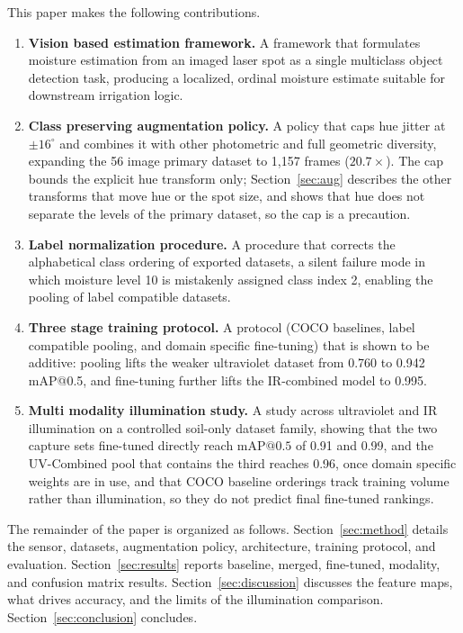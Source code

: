 ﻿\documentclass[journal]{IEEEtran}
\begin{document}
This paper makes the following contributions.
\begin{enumerate}
\item \textbf{Vision based estimation framework.} A framework that formulates moisture estimation from an imaged laser spot as a single multiclass object detection task, producing a localized, ordinal moisture estimate suitable for downstream irrigation logic.
\item \textbf{Class preserving augmentation policy.} A policy that caps hue jitter at $\pm 16^{\circ}$ and combines it with other photometric and full geometric diversity, expanding the 56 image primary dataset to 1{,}157 frames ($20.7\times$). The cap bounds the explicit hue transform only; Section~\ref{sec:aug} describes the other transforms that move hue or the spot size, and shows that hue does not separate the levels of the primary dataset, so the cap is a precaution.
\item \textbf{Label normalization procedure.} A procedure that corrects the alphabetical class ordering of exported datasets, a silent failure mode in which moisture level 10 is mistakenly assigned class index 2, enabling the pooling of label compatible datasets.
\item \textbf{Three stage training protocol.} A protocol (COCO baselines, label compatible pooling, and domain specific fine-tuning) that is shown to be additive: pooling lifts the weaker ultraviolet dataset from 0.760 to 0.942 mAP@0.5, and fine-tuning further lifts the IR-combined model to 0.995.
\item \textbf{Multi modality illumination study.} A study across ultraviolet and IR illumination on a controlled soil-only dataset family, showing that the two capture sets fine-tuned directly reach $\text{mAP@0.5}$ of 0.91 and 0.99, and the UV-Combined pool that contains the third reaches 0.96, once domain specific weights are in use, and that COCO baseline orderings track training volume rather than illumination, so they do not predict final fine-tuned rankings.
\end{enumerate}

The remainder of the paper is organized as follows. Section~\ref{sec:method} details the sensor, datasets, augmentation policy, architecture, training protocol, and evaluation. Section~\ref{sec:results} reports baseline, merged, fine-tuned, modality, and confusion matrix results. Section~\ref{sec:discussion} discusses the feature maps, what drives accuracy, and the limits of the illumination comparison. Section~\ref{sec:conclusion} concludes.
\end{document}

